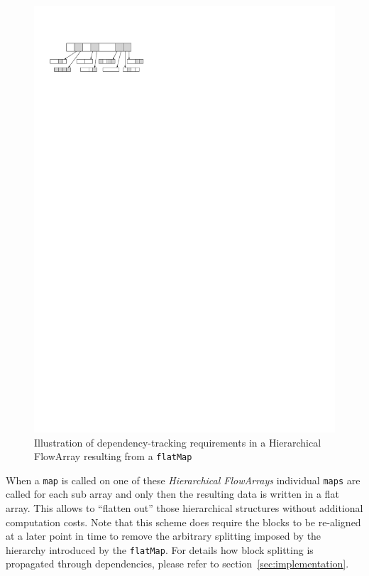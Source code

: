 \documentclass[runningheads,a4paper,fleqn]{llncs}
\begin{document}
\begin{figure}
  \centering
  \includegraphics{flatMap-dependency}
  \caption{Illustration of dependency-tracking requirements in a
    Hierarchical FlowArray resulting from a \texttt{flatMap}}
  \label{fig:flatMap-dependency}
\end{figure}

When a \texttt{map} is called on one of these \emph{Hierarchical
  FlowArrays} individual \texttt{maps} are called for each sub array
and only then the resulting data is written in a flat array. This
allows to ``flatten out'' those hierarchical structures without
additional computation costs. Note that this scheme does require the
blocks to be re-aligned at a later point in time to remove the
arbitrary splitting imposed by the hierarchy introduced by the
\texttt{flatMap}. For details how block splitting is propagated
through dependencies, please refer to
section~\ref{sec:implementation}.
\end{document}
